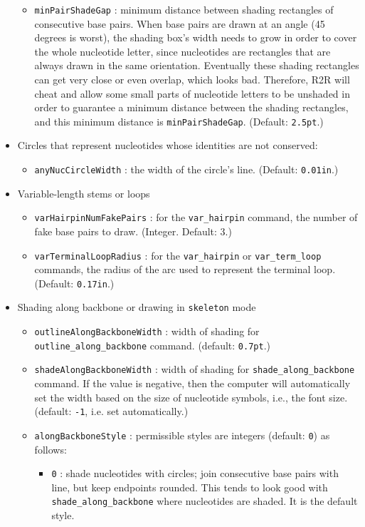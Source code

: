 \documentclass[letterpaper,12pt]{report}
\begin{document}
\begin{itemize}
\begin{itemize}
	\item {\tt minPairShadeGap} : minimum distance between shading rectangles of consecutive base pairs.  When base pairs are drawn at an angle (45 degrees is worst), the shading box's width needs to grow in order to cover the whole nucleotide letter, since nucleotides are rectangles that are always drawn in the same orientation.  Eventually these shading rectangles can get very close or even overlap, which looks bad.  Therefore, R2R will cheat and allow some small parts of nucleotide letters to be unshaded in order to guarantee a minimum distance between the shading rectangles, and this minimum distance is {\tt minPairShadeGap}. (Default: {\tt 2.5pt}.)
	\end{itemize}
\item Circles that represent nucleotides whose identities are not conserved:
	\begin{itemize}
	\item {\tt anyNucCircleWidth} : the width of the circle's line. (Default: {\tt 0.01in}.)
	\end{itemize}
\item Variable-length stems or loops
	\begin{itemize}
	\item {\tt varHairpinNumFakePairs} : for the {\tt var\_hairpin} command, the number
	of fake base pairs to draw. (Integer. Default: 3.)
	\item {\tt varTerminalLoopRadius} : for the {\tt var\_hairpin} or {\tt var\_term\_loop} commands, the radius of the arc used to represent the terminal loop. (Default: {\tt 0.17in}.)
	\end{itemize}
\item Shading along backbone or drawing in {\tt skeleton} mode
	\begin{itemize}
	\item {\tt outlineAlongBackboneWidth} : width of shading for {\tt outline\_along\_backbone} command.  (default: {\tt 0.7pt}.)
	\item {\tt shadeAlongBackboneWidth} : width of shading for {\tt shade\_along\_backbone} command.  If the value is negative, then the computer will automatically set the width based on the size of nucleotide symbols, i.e., the font size.  (default: {\tt -1}, i.e. set automatically.)
	\item {\tt alongBackboneStyle} : permissible styles are integers (default: {\tt 0}) as follows:
		\begin{itemize}
		\item {\tt 0} : shade nucleotides with circles; join consecutive base pairs with line, but keep endpoints rounded.  This tends to look good with {\tt shade\_along\_backbone} where nucleotides are shaded.  It is the default style.

\end{itemize}
\end{itemize}
\end{itemize}
\end{document}
